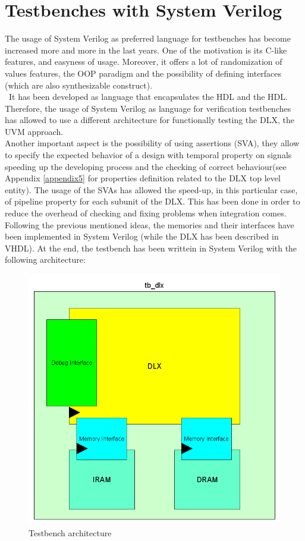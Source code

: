 \section{Testbenches with System Verilog}
The usage of System Verilog as preferred language for testbenches has become increased more and more in the last years. One of the motivation is its C-like features, and easyness of usage. Moreover, it offers a lot of randomization of values features, the OOP paradigm and the possibility of defining interfaces (which are also synthesizable construct).\\\
It has been developed as language that encapsulates the HDL and the HDL. Therefore, the usage of System Verilog as language for verification testbenches has allowed to use a different architecture for functionally testing the DLX, the UVM approach.\\
Another important aspect is the possibility of using assertions (SVA), they allow to specify the expected behavior of a design with temporal property on signals speeding up the developing process and the checking of correct behaviour(see Appendix \ref{appendix5} for properties definition related to the DLX top level entity). The usage of the SVAs has allowed the speed-up, in this particular case, of pipeline property  for each subunit of the DLX. This has been done in order to reduce the overhead of checking and fixing problems when integration comes.\\

Following the previous mentioned ideas, the memories and their interfaces have been implemented in System Verilog (while the DLX has been described in VHDL). At the end, the testbench has been writtein in System Verilog with the following architecture: 
\begin{figure}[!htbp]
\centering
\captionsetup{justification=centering}
\includegraphics[scale=0.35,angle=0]{./chapters/figures/tb_dlx.png}
\caption{Testbench architecture}
\label{fig:tbdlx}
\end{figure}

